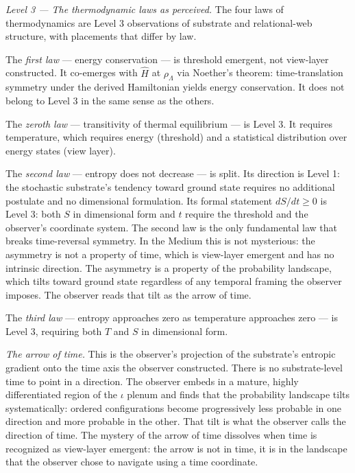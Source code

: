 \documentclass[11pt,letterpaper]{article}
\begin{document}
\emph{Level 3 --- The thermodynamic laws as perceived.} The four laws of thermodynamics are Level 3 observations of substrate and relational-web structure, with placements that differ by law.

The \emph{first law} --- energy conservation --- is threshold emergent, not view-layer constructed. It co-emerges with \(\hat{H}\) at \(\rho_\Lambda\) via Noether's theorem: time-translation symmetry under the derived Hamiltonian yields energy conservation. It does not belong to Level 3 in the same sense as the others.

The \emph{zeroth law} --- transitivity of thermal equilibrium --- is Level 3. It requires temperature, which requires energy (threshold) and a statistical distribution over energy states (view layer).

The \emph{second law} --- entropy does not decrease --- is split. Its direction is Level 1: the stochastic substrate's tendency toward ground state requires no additional postulate and no dimensional formulation. Its formal statement \(dS/dt \geq 0\) is Level 3: both \(S\) in dimensional form and \(t\) require the threshold and the observer's coordinate system. The second law is the only fundamental law that breaks time-reversal symmetry. In the Medium this is not mysterious: the asymmetry is not a property of time, which is view-layer emergent and has no intrinsic direction. The asymmetry is a property of the probability landscape, which tilts toward ground state regardless of any temporal framing the observer imposes. The observer reads that tilt as the arrow of time.

The \emph{third law} --- entropy approaches zero as temperature approaches zero --- is Level 3, requiring both \(T\) and \(S\) in dimensional form.

\emph{The arrow of time.} This is the observer's projection of the substrate's entropic gradient onto the time axis the observer constructed. There is no substrate-level time to point in a direction. The observer embeds in a mature, highly differentiated region of the \(\iota\) plenum and finds that the probability landscape tilts systematically: ordered configurations become progressively less probable in one direction and more probable in the other. That tilt is what the observer calls the direction of time. The mystery of the arrow of time dissolves when time is recognized as view-layer emergent: the arrow is not in time, it is in the landscape that the observer chose to navigate using a time coordinate.
\end{document}
